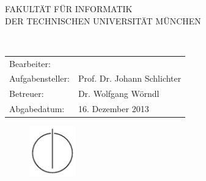 


\def\bcorcor{0.15cm}
\addtolength{\hoffset}{\bcorcor}

\thispagestyle{empty}

 \vspace{10mm}
\begin{center}
	       \oTUM{4cm}

	   \vspace{5mm}
	   \huge FAKULTÄT FÜR INFORMATIK\\
	   \vspace{0.5cm}
	 \large DER TECHNISCHEN UNIVERSITÄT MÜNCHEN\\

	\end{center}


\vspace{5mm}
\begin{center}

   {\Large \doctype}

  \vspace{5mm}


  \vspace{5mm}

  \begin{spacing}{2}
    {\LARGE \titleGer}\\
  \end{spacing}

  \vspace{15mm}

    \begin{tabular}{ll}
	   \Large Bearbeiter:         & \Large \author \\[2mm]
	   \Large Aufgabensteller:    & \Large Prof. Dr. Johann Schlichter \\[2mm]
	   \Large Betreuer:	         & \Large Dr. Wolfgang Wörndl \\[2mm]
	   \Large Abgabedatum:        & \Large 16. Dezember 2013
	 \end{tabular}

	 \vspace{5mm}

	 \begin{figure}[h!]
  \centering
   \includegraphics[width=2cm]{styles/in_tum_logo.pdf}
  \end{figure}


\end{center}

\addtolength{\hoffset}{\bcorcor}
